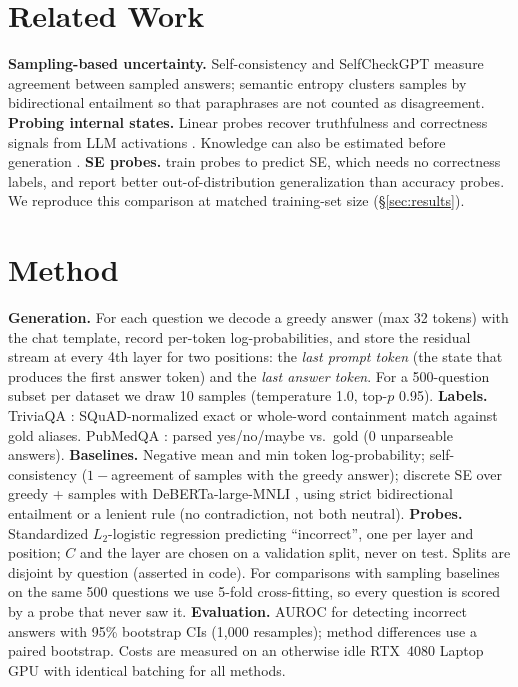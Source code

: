 \documentclass[10pt,twocolumn]{article}
\begin{document}
\section{Related Work}
\textbf{Sampling-based uncertainty.} Self-consistency \citep{wang2023selfconsistency} and
SelfCheckGPT \citep{manakul2023selfcheckgpt} measure agreement between sampled answers;
semantic entropy \citep{kuhn2023semantic,farquhar2024detecting} clusters samples by
bidirectional entailment so that paraphrases are not counted as disagreement.
\textbf{Probing internal states.} Linear probes \citep{alain2016probes} recover truthfulness
and correctness signals from LLM activations \citep{azaria2023internal,burns2023discovering,
marks2024geometry,kadavath2022language,chwang2024androids,orgad2025llms}. Knowledge can
also be estimated before generation \citep{gottesman2024estimating}.
\textbf{SE probes.} \citet{kossen2024sep} train probes to predict SE, which needs no correctness
labels, and report better out-of-distribution generalization than accuracy probes. We
reproduce this comparison at matched training-set size (\S\ref{sec:results}).

\section{Method}
\label{sec:method}
\textbf{Generation.} For each question we decode a greedy answer (max 32 tokens) with the chat
template, record per-token log-probabilities, and store the residual stream at every 4th
layer for two positions: the \emph{last prompt token} (the state that produces the first
answer token) and the \emph{last answer token}. For a 500-question subset per dataset we draw
10 samples (temperature 1.0, top-$p$ 0.95).
\textbf{Labels.} TriviaQA \citep{joshi2017triviaqa}: SQuAD-normalized exact or whole-word
containment match against gold aliases. PubMedQA \citep{jin2019pubmedqa}: parsed
yes/no/maybe vs.\ gold (0 unparseable answers).
\textbf{Baselines.} Negative mean and min token log-probability; self-consistency
($1-$agreement of samples with the greedy answer); discrete SE over greedy + samples with
DeBERTa-large-MNLI \citep{he2021deberta}, using strict bidirectional entailment
\citep{kuhn2023semantic} or a lenient rule (no contradiction, not both neutral).
\textbf{Probes.} Standardized $L_2$-logistic regression predicting ``incorrect'', one per
layer and position; $C$ and the layer are chosen on a validation split, never on test.
Splits are disjoint by question (asserted in code). For comparisons with sampling
baselines on the same 500 questions we use 5-fold cross-fitting, so every question is
scored by a probe that never saw it.
\textbf{Evaluation.} AUROC for detecting incorrect answers with 95\% bootstrap CIs (1{,}000
resamples); method differences use a paired bootstrap. Costs are measured on an otherwise
idle RTX~4080 Laptop GPU with identical batching for all methods.
\end{document}

